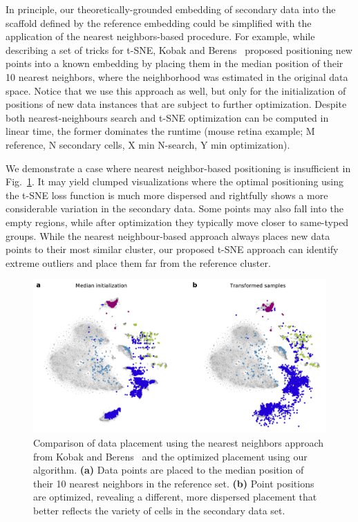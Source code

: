 \documentclass[runningheads]{llncs}
\begin{document}
In principle, our theoretically-grounded embedding of secondary data into the
scaffold defined by the reference embedding could be simplified with the
application of the nearest neighbors-based procedure. For example, while
describing a set of tricks for t-SNE, Kobak and Berens~\cite{art_of_using_tsne}
proposed positioning new points into a known embedding by placing them in the
median position of their 10 nearest neighbors, where the neighborhood was
estimated in the original data space. Notice that we use this approach as well,
but only for the initialization of positions of new data instances that are
subject to further optimization. Despite both nearest-neighbours search and
t-SNE optimization can be computed in linear time, the former dominates the
runtime (mouse retina example; M reference, N secondary cells, X min N-search,
Y min optimization). 

We demonstrate a case where nearest neighbor-based positioning is insufficient
in Fig.~\ref{fig:optimization}. It may yield clumped visualizations where the
optimal positioning using the t-SNE loss function is much more dispersed and
rightfully shows a more considerable variation in the secondary data. 
Some points may also fall into the empty regions, while after optimization they typically
move closer to same-typed groups. While the nearest neighbour-based approach
always places new data points to their most similar cluster, our proposed
t-SNE approach can identify extreme outliers and place them far from the
reference cluster.


\begin{figure}[htbp]
\includegraphics[width=\textwidth]{figures/optimization_retina.pdf}
\caption{Comparison of data placement using the nearest neighbors approach from Kobak
and Berens~\cite{art_of_using_tsne} and the optimized placement using our algorithm.
{\bf (a)} Data points are placed to the median position of their 10 nearest
neighbors in the reference set. {\bf (b)} Point positions are optimized,
revealing a different, more dispersed placement that better reflects the
variety of cells in the secondary data set.}
\label{fig:optimization}
\end{figure}
\end{document}
